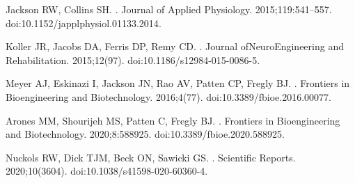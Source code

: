 \documentclass[10pt,letterpaper]{article}
\begin{document}
\begin{thebibliography}{10}
Jackson RW, Collins SH.
.
\newblock Journal of Applied Physiology. 2015;119:541--557.
\newblock doi:{10.1152/japplphysiol.01133.2014}.

Koller JR, Jacobs DA, Ferris DP, Remy CD.
.
\newblock Journal ofNeuroEngineering and Rehabilitation. 2015;12(97).
\newblock doi:{10.1186/s12984-015-0086-5}.

Meyer AJ, Eskinazi I, Jackson JN, Rao AV, Patten CP, Fregly BJ.
.
\newblock Frontiers in Bioengineering and Biotechnology. 2016;4(77).
\newblock doi:{10.3389/fbioe.2016.00077}.

Arones MM, Shourijeh MS, Patten C, Fregly BJ.
.
\newblock Frontiers in Bioengineering and Biotechnology. 2020;8:588925.
\newblock doi:{10.3389/fbioe.2020.588925}.

Nuckols RW, Dick TJM, Beck ON, Sawicki GS.
.
\newblock Scientific Reports. 2020;10(3604).
\newblock doi:{10.1038/s41598-020-60360-4}.

\end{thebibliography}
\end{document}
